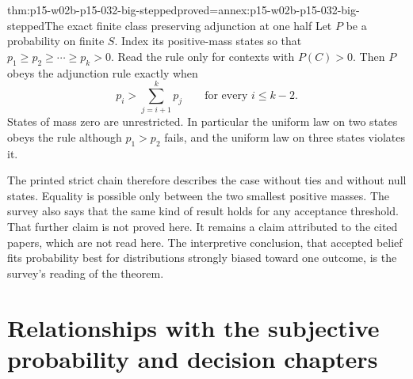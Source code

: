 \begin{hbtheorem}{thm:p15-w02b-p15-032-big-stepped}{proved=annex:p15-w02b-p15-032-big-stepped}{The exact finite class preserving adjunction at one half}
Let \(P\) be a probability on finite \(S\). Index its positive-mass states
so that \(p_1\geq p_2\geq\cdots\geq p_k>0\). Read the rule only for contexts
with \(P(C)>0\). Then \(P\) obeys the adjunction rule exactly when
\[
 p_i>\sum_{j=i+1}^{k}p_j\qquad\text{for every }i\leq k-2.
\]
States of mass zero are unrestricted. In particular the uniform law on two
states obeys the rule although \(p_1>p_2\) fails, and the uniform law on
three states violates it.
\end{hbtheorem}

The printed strict chain therefore describes the case without ties and
without null states. Equality is possible only between the two smallest
positive masses. The survey also says that the same kind of result holds
for any acceptance threshold. That further claim is not proved here.
It remains a claim attributed to the cited papers, which are not read
here. The interpretive conclusion, that accepted belief fits probability
best for distributions strongly biased toward one outcome, is the
survey's reading of the theorem.

\section{Relationships with the subjective probability and decision chapters}
\label{sec:p15-w02b-p15-032-relations}

